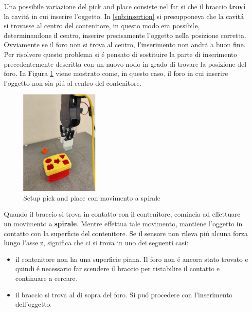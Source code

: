 Una possibile variazione del pick and place consiste nel far si che il braccio \textbf{trovi} la cavit\'{a} in cui inserire l'oggetto. 
In \ref{sub:insertion} si presupponeva che la cavit\'{a} si trovasse al centro del contenitore, in questo modo era possibile, 
determinandone il centro, inserire precisamente l'oggetto nella posizione corretta. Ovviamente se il foro non si trova al centro, 
l'inserimento non andr\'{a} a buon fine. Per risolvere questo problema si \'{e} pensato di sostituire la parte di inserimento 
precedentemente descritta con un nuovo nodo in grado di trovare la posizione del foro\footnotemark{}. 
In Figura \ref{fig:spiral_pick_place} viene mostrato come, in questo caso, il foro in cui inserire l'oggetto non sia pi\'{u} al centro 
del contenitore. 
\newpage
\begin{figure}[H]
    \centering
    \includegraphics*[width=0.35\textwidth]{images/spiral_pick_place.jpg}
    \caption{Setup pick and place con movimento a spirale}
    \label{fig:spiral_pick_place}
\end{figure}
Quando il braccio si trova in contatto con il contenitore, comincia ad effettuare un movimento a \textbf{spirale}. 
Mentre effettua tale movimento, mantiene l'oggetto in contatto con la superficie del contenitore. Se il sensore 
non rileva pi\'{u} alcuna forza lungo l'asse z, significa che ci si trova in uno dei seguenti casi:
\begin{itemize}
    \item il contenitore non ha una superficie piana. Il foro non \'{e} ancora stato trovato e quindi \'{e} necessario far scendere 
    il braccio per ristabilire il contatto e continuare a cercare.
    \item il braccio si trova al di sopra del foro. Si pu\'{o} procedere con l'inserimento dell'oggetto.
\end{itemize} 
